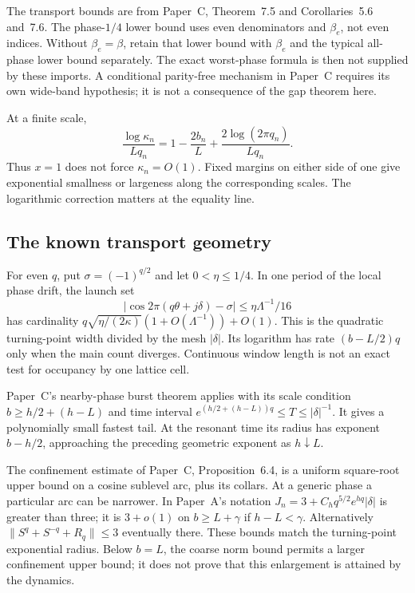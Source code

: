 The transport bounds are from Paper~C, Theorem~7.5 and Corollaries~5.6 and~7.6. The phase-$1/4$ lower bound uses even denominators and $\beta_e$, not even indices. Without $\beta_e=\beta$, retain that lower bound with $\beta_e$ and the typical all-phase lower bound separately. The exact worst-phase formula is then not supplied by these imports. A conditional parity-free mechanism in Paper~C requires its own wide-band hypothesis; it is not a consequence of the gap theorem here.

At a finite scale,
\begin{equation}\label{eq:finitecross}
 \frac{\log\kappa_n}{Lq_n}
 =1-\frac{2b_n}{L}+\frac{2\log(2\pi q_n)}{Lq_n}.
\end{equation}
Thus $x=1$ does not force $\kappa_n=O(1)$. Fixed margins on either side of one give exponential smallness or largeness along the corresponding scales. The logarithmic correction matters at the equality line.

\subsection{The known transport geometry}
For even $q$, put $\sigma=(-1)^{q/2}$ and let $0<\eta\le1/4$. In one period of the local phase drift, the launch set
\[
 \left|\cos2\pi(q\theta+j\delta)-\sigma\right|
                     \le\eta\Lambda^{-1}/16
\]
has cardinality $q\sqrt{\eta/(2\kappa)}(1+O(\Lambda^{-1}))+O(1)$. This is the quadratic turning-point width divided by the mesh $|\delta|$. Its logarithm has rate $(b-L/2)q$ only when the main count diverges. Continuous window length is not an exact test for occupancy by one lattice cell.

Paper~C's nearby-phase burst theorem applies with its scale condition $b\ge h/2+(h-L)$ and time interval $e^{(h/2+(h-L))q}\le T\le|\delta|^{-1}$. It gives a polynomially small fastest tail. At the resonant time its radius has exponent $b-h/2$, approaching the preceding geometric exponent as $h\downarrow L$.

The confinement estimate of Paper~C, Proposition~6.4, is a uniform square-root upper bound on a cosine sublevel arc, plus its collars. At a generic phase a particular arc can be narrower. In Paper~A's notation $J_n=3+C_hq^{5/2}e^{hq}|\delta|$ is greater than three; it is $3+o(1)$ on $b\ge L+\gamma$ if $h-L<\gamma$. Alternatively $\|S^q+S^{-q}+R_q\|\le3$ eventually there. These bounds match the turning-point exponential radius. Below $b=L$, the coarse norm bound permits a larger confinement upper bound; it does not prove that this enlargement is attained by the dynamics.

